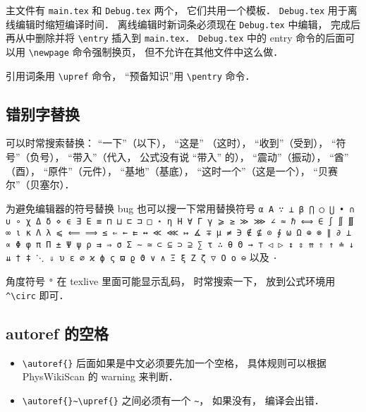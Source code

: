 主文件有 \verb|main.tex| 和 \verb|Debug.tex| 两个， 它们共用一个模板． \verb|Debug.tex| 用于离线编辑时缩短编译时间． 离线编辑时新词条必须现在 \verb|Debug.tex| 中编辑， 完成后再从中删除并将 \verb|\entry| 插入到 \verb|main.tex|． \verb|Debug.tex| 中的 entry 命令的后面可以用 \verb|\newpage| 命令强制换页， 但不允许在其他文件中这么做．

引用词条用 \verb|\upref| 命令， “预备知识”用 \verb|\pentry| 命令．

\subsection{错别字替换}
可以时常搜索替换： “一下”（以下）， “这是” （这时）， “收到”（受到）， “符号”（负号）， “带入”（代入， 公式没有说 “带入” 的）， “震动”（振动）， “酋” （酉）， “原件”（元件）， “基地”（基底）， “这时一个”（这是一个）， “贝赛尔”（贝塞尔）．

为避免编辑器的符号替换 bug 也可以搜一下常用替换符号 \verb|α Α ∵ ⊥ β ⋂ ◯ ⋃ • ∩ ∪ ∘ χ Δ δ ⋄ ϵ ∃ Ε ≡ ⊓ ⊔ ⊏ ⊐ □ ⋆ η Η ∀ Γ γ ⩾ ≥ ≫ ⋙ ∠ ≈ ℏ ⟺ ∈ ∫ ∬ ∭ ∞ ι κ Λ λ ⩽ ⟸ ⟹ ≤ ⇐ ← ⇇ ↔ ≪ ⋘ ↦ ∡ ∓ μ ≠ ∋ ∉ ⊈ ⊙ ∮ ω Ω ⊕ ⊗ ∥ ∂ ⟂ ∝ Φ φ π Π ± Ψ ψ ρ ⇉ ⇒ σ Σ ∼ ≃ ⊂ ⊆ ⊃ ⊇ ∑ τ ∴ θ Θ → ⊤ ◁ ▷ ↕ ⇕ ⇈ ⇑ ↑ ≐ ↓ ⇊ † ‡ ⋱ ⇓ υ ε ∅ ϰ ϕ ς ϖ ϱ ϑ ∨ ∧ Ξ ξ Ζ ζ ▽ Ο ο ⊖| 以及 \verb|·|

角度符号 \verb|°| 在 texlive 里面可能显示乱码， 时常搜索一下， 放到公式环境用 \verb|^\circ| 即可．

\subsection{autoref 的空格}
\begin{itemize}
\item \verb|\autoref{}| 后面如果是中文必须要先加一个空格， 具体规则可以根据 PhysWikiScan 的 warning 来判断．
\item \verb|\autoref{}~\upref{}| 之间必须有一个 \verb|~|， 如果没有， 编译会出错．
\end{itemize}
